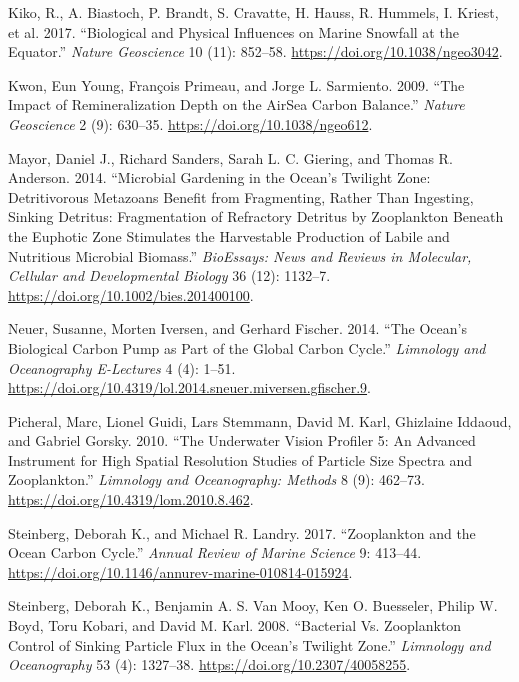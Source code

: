 \documentclass[]{article}
\begin{document}
\leavevmode\hypertarget{ref-kikoBiologicalPhysicalInfluences2017}{}%
Kiko, R., A. Biastoch, P. Brandt, S. Cravatte, H. Hauss, R. Hummels, I.
Kriest, et al. 2017. ``Biological and Physical Influences on Marine
Snowfall at the Equator.'' \emph{Nature Geoscience} 10 (11): 852--58.
\url{https://doi.org/10.1038/ngeo3042}.

\leavevmode\hypertarget{ref-kwonImpactRemineralizationDepth2009}{}%
Kwon, Eun Young, François Primeau, and Jorge L. Sarmiento. 2009. ``The
Impact of Remineralization Depth on the AirSea Carbon Balance.''
\emph{Nature Geoscience} 2 (9): 630--35.
\url{https://doi.org/10.1038/ngeo612}.

\leavevmode\hypertarget{ref-mayorMicrobialGardeningOcean2014}{}%
Mayor, Daniel J., Richard Sanders, Sarah L. C. Giering, and Thomas R.
Anderson. 2014. ``Microbial Gardening in the Ocean's Twilight Zone:
Detritivorous Metazoans Benefit from Fragmenting, Rather Than Ingesting,
Sinking Detritus: Fragmentation of Refractory Detritus by Zooplankton
Beneath the Euphotic Zone Stimulates the Harvestable Production of
Labile and Nutritious Microbial Biomass.'' \emph{BioEssays: News and
Reviews in Molecular, Cellular and Developmental Biology} 36 (12):
1132--7. \url{https://doi.org/10.1002/bies.201400100}.

\leavevmode\hypertarget{ref-neuerOceanBiologicalCarbon2014}{}%
Neuer, Susanne, Morten Iversen, and Gerhard Fischer. 2014. ``The Ocean's
Biological Carbon Pump as Part of the Global Carbon Cycle.''
\emph{Limnology and Oceanography E-Lectures} 4 (4): 1--51.
\url{https://doi.org/10.4319/lol.2014.sneuer.miversen.gfischer.9}.

\leavevmode\hypertarget{ref-picheralUnderwaterVisionProfiler2010}{}%
Picheral, Marc, Lionel Guidi, Lars Stemmann, David M. Karl, Ghizlaine
Iddaoud, and Gabriel Gorsky. 2010. ``The Underwater Vision Profiler 5:
An Advanced Instrument for High Spatial Resolution Studies of Particle
Size Spectra and Zooplankton.'' \emph{Limnology and Oceanography:
Methods} 8 (9): 462--73. \url{https://doi.org/10.4319/lom.2010.8.462}.

\leavevmode\hypertarget{ref-steinbergZooplanktonOceanCarbon2017}{}%
Steinberg, Deborah K., and Michael R. Landry. 2017. ``Zooplankton and
the Ocean Carbon Cycle.'' \emph{Annual Review of Marine Science} 9:
413--44. \url{https://doi.org/10.1146/annurev-marine-010814-015924}.

\leavevmode\hypertarget{ref-steinbergBacterialVsZooplankton2008}{}%
Steinberg, Deborah K., Benjamin A. S. Van Mooy, Ken O. Buesseler, Philip
W. Boyd, Toru Kobari, and David M. Karl. 2008. ``Bacterial Vs.
Zooplankton Control of Sinking Particle Flux in the Ocean's Twilight
Zone.'' \emph{Limnology and Oceanography} 53 (4): 1327--38.
\url{https://doi.org/10.2307/40058255}.
\end{document}
